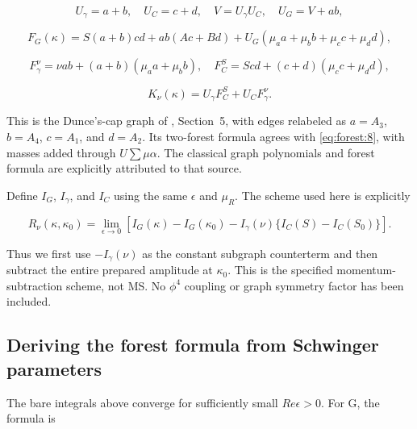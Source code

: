 \documentclass[11pt,a4paper,oneside]{article}
\theoremstyle{plain}
\theoremstyle{definition}
\theoremstyle{remark}
\numberwithin{equation}{section}
\begin{document}
\begin{equation}
U_\gamma=a+b,\quad U_C=c+d,\quad V=U_\gamma U_C,
 \quad U_G=V+ab,                                                \label{eq:forest:7}
\end{equation}

\begin{equation}
F_G(\kappa)=S(a+b)cd+ab(Ac+Bd)
                +U_G(\mu_a a+\mu_b b+\mu_c c+\mu_d d),           \label{eq:forest:8}
\end{equation}

\begin{equation}
F_\gamma^\nu=\nu ab+(a+b)(\mu_a a+\mu_b b),\quad
 F_C^S=S cd+(c+d)(\mu_c c+\mu_d d),
\end{equation}

\begin{equation}
K_\nu(\kappa)=U_\gamma F_C^S+U_C F_\gamma^\nu.                  \label{eq:forest:9}
\end{equation}

This is the Dunce's-cap graph of \cite{bk2012}, Section~5, with edges relabeled as \(a=A_3\), \(b=A_4\), \(c=A_1\), and \(d=A_2\). Its two-forest formula agrees with \eqref{eq:forest:8}, with masses added through \(U\sum \mu \alpha \). The classical graph polynomials and forest formula are explicitly attributed to that source.

Define \(I_G\), \(I_\gamma \), and \(I_C\) using the same \(\epsilon \) and \(\mu _R\). The scheme used here is explicitly

\begin{equation}
R_\nu(\kappa,\kappa_0)=\lim_{\epsilon\to0}
 \left[I_G(\kappa)-I_G(\kappa_0)
 -I_\gamma(\nu)\{I_C(S)-I_C(S_0)\}\right].                       \label{eq:forest:10}
\end{equation}

Thus we first use \(- I_\gamma (\nu )\) as the constant subgraph counterterm and then subtract the entire prepared amplitude at \(\kappa _0\). This is the specified momentum-subtraction scheme, not MS. No \(\phi ^{4}\) coupling or graph symmetry factor has been included.


\subsection{Deriving the forest formula from Schwinger parameters}\label{sec:forest:3}

The bare integrals above converge for sufficiently small \(Re \epsilon >0\). For G, the formula is
\end{document}
